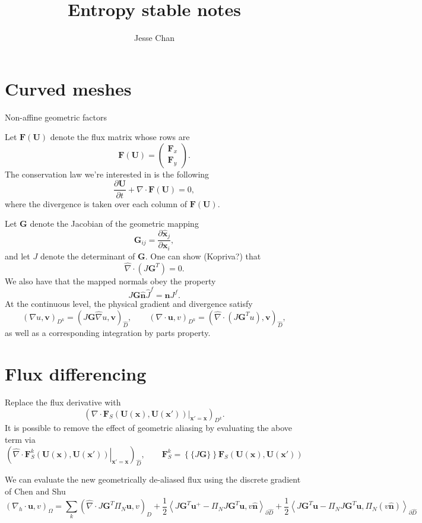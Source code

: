 \documentclass[preprint,10pt]{article}
\date{}
\author{Jesse Chan}
\title{Entropy stable notes}
\theoremstyle{definition}
\theoremstyle{lemma}
\theoremstyle{theorem}
\theoremstyle{assumption}
\renewcommand{\hat}{\widehat}
\newcommand{\pd}[2]{\frac{\partial#1}{\partial#2}}
\newcommand{\LRp}[1]{\left( #1 \right)}
\newcommand{\LRa}[1]{\left\langle #1 \right\rangle}
\newcommand{\LRc}[1]{\left\{ #1 \right\}}
\newcommand{\LRl}[1]{\left. #1 \right|}
\newcommand{\Grad} {\ensuremath{\nabla}}
\newcommand{\avg}[1] {\ensuremath{\LRc{\!\{#1\}\!}}}
\renewcommand{\d}{\partial}
\begin{document}
\maketitle

\section{Curved meshes}

Non-affine geometric factors

Let $\bm{F}(\bm{U})$ denote the flux matrix whose rows are 
\[
\bm{F}(\bm{U}) = \LRp{
\begin{array}{c}
\bm{F}_x \\
\bm{F}_y
\end{array}
}.
\]
The conservation law we're interested in is the following
\[
\pd{\bm{U}}{t} + \Grad \cdot \bm{F}(\bm{U}) = 0,
\]
where the divergence is taken over each column of $\bm{F}(\bm{U})$.  

Let $\bm{G}$ denote the Jacobian of the geometric mapping
\[
\bm{G}_{ij} = \pd{\hat{\bm{x}}_j}{\bm{x}_i},
\]
and let $J$ denote the determinant of $\bm{G}$.  One can show (Kopriva?) that
\[
\hat{\Grad} \cdot \LRp{J\bm{G}^T} = 0.  
\]
We also have that the mapped normals obey the property
\[
J\bm{G} \hat{\bm{n}}\hat{J}^f = \bm{n}J^f.
\]
At the continuous level, the physical gradient and divergence satisfy
\[
\LRp{\Grad u, \bm{v}}_{D^k} = \LRp{J\bm{G} \hat{\Grad} u,\bm{v}}_{\hat{D}}, \qquad \LRp{\Grad\cdot \bm{u},v}_{D^k} = \LRp{\hat{\Grad}\cdot \LRp{J\bm{G}^T u},\bm{v}}_{\hat{D}}, 
\]
as well as a corresponding integration by parts property.  

\section{Flux differencing}

Replace the flux derivative with
\[
\LRp{\LRl{\Grad \cdot \bm{F}_S(\bm{U}(\bm{x}),\bm{U}(\bm{x}'))}_{\bm{x}' = \bm{x}}}_{D^k}.
\]
It is possible to remove the effect of geometric aliasing by evaluating the above term via
\[
\LRp{\LRl{\hat{\Grad} \cdot \bm{F}^k_S(\bm{U}(\bm{x}),\bm{U}(\bm{x}'))}_{\bm{x}' = \bm{x}}}_{\hat{D}}, \qquad \bm{F}^k_S = \avg{J\bm{G}}\bm{F}_S\LRp{\bm{U}(\bm{x}),\bm{U}(\bm{x}')}
\]

We can evaluate the new geometrically de-aliased flux using the discrete gradient of Chen and Shu
\[
\LRp{\Grad_h \cdot \bm{u},v}_{\Omega} = \sum_k \LRp{\hat{\Grad} \cdot J\bm{G}^T\Pi_N \bm{u},v }_{\hat{D}} + \frac{1}{2}\LRa{J\bm{G}^T\bm{u}^+ - \Pi_N J\bm{G}^T\bm{u}, v \hat{\bm{n}}}_{\d \hat{D}} + \frac{1}{2}\LRa{J\bm{G}^T\bm{u} - \Pi_N J\bm{G}^T\bm{u}, \Pi_N\LRp{v\hat{\bm{n}}}}_{\d \hat{D}}
\]
\end{document}
